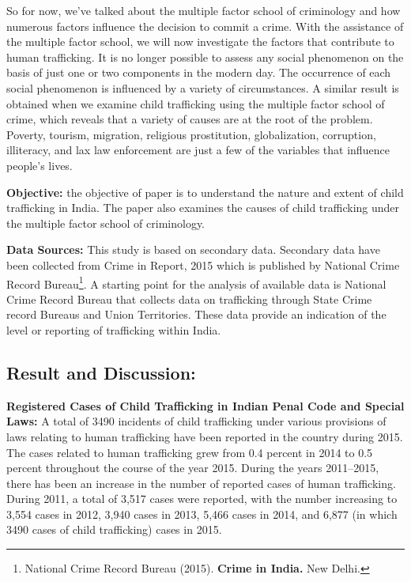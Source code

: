 \vspace{-.3cm}

\begin{multicols}{2}

\noi
So for now, we've talked about the multiple factor school of criminology and how numerous factors influence the decision to commit a crime. With the assistance of the multiple factor school, we will now investigate the factors that contribute to human trafficking. It is no longer possible to assess any social phenomenon on the basis of just one or two components in the modern day. The occurrence of each social phenomenon is influenced by a variety of circumstances. A similar result is obtained when we examine child trafficking using the multiple factor school of crime, which reveals that a variety of causes are at the root of the problem. Poverty, tourism, migration, religious prostitution, globalization, corruption, illiteracy, and lax law enforcement are just a few of the variables that influence people's lives.

\noi
\textbf{Objective:} the objective of paper is to understand the nature and extent of child trafficking in India. The paper also examines the causes of child trafficking under the multiple factor school of criminology.

\noi
\textbf{Data Sources:} This study is based on secondary data. Secondary data have been collected from Crime in Report, 2015 which is published by National Crime Record Bureau\footnote{National Crime Record Bureau (2015). \textbf{Crime in India.} New Delhi.}. A starting point for the analysis of available data is National Crime Record Bureau that collects data on trafficking through State Crime record Bureaus and Union Territories. These data provide an indication of the level or reporting of trafficking within India. 

\subsection*{Result and Discussion:}

\noi
\textbf{Registered Cases of Child Trafficking in Indian Penal Code and Special Laws:} A total of 3490 incidents of child trafficking under various provisions of laws relating to human trafficking have been reported in the country during 2015. The cases related to human trafficking grew from 0.4 percent in 2014 to 0.5 percent throughout the course of the year 2015. During the years 2011–2015, there has been an increase in the number of reported cases of human trafficking. During 2011, a total of 3,517 cases were reported, with the number increasing to 3,554 cases in 2012, 3,940 cases in 2013, 5,466 cases in 2014, and 6,877 (in which 3490 cases of child trafficking) cases in 2015.


\end{multicols}
